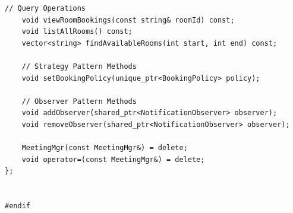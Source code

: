 \documentclass[11pt,a4paper]{article}
\begin{document}
\begin{lstlisting}[title={\texttt{managers.hpp}}]
    // Query Operations
    void viewRoomBookings(const string& roomId) const;
    void listAllRooms() const;
    vector<string> findAvailableRooms(int start, int end) const;
    
    // Strategy Pattern Methods
    void setBookingPolicy(unique_ptr<BookingPolicy> policy);
    
    // Observer Pattern Methods
    void addObserver(shared_ptr<NotificationObserver> observer);
    void removeObserver(shared_ptr<NotificationObserver> observer);

    MeetingMgr(const MeetingMgr&) = delete;
    void operator=(const MeetingMgr&) = delete;
};


#endif
\end{lstlisting}

\newpage
\end{document}
